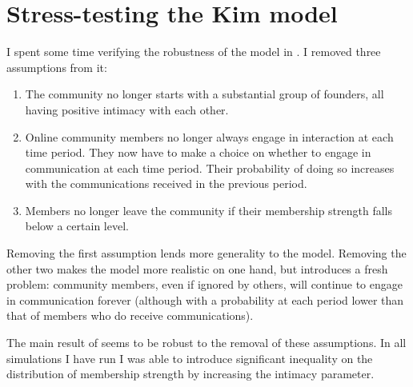 \documentclass{article}
\begin{document}
\maketitle

\tableofcontents

\section{Stress-testing the Kim model}

I spent some time verifying the robustness of the model in \cite{kim2015group}. I removed three assumptions from it:

\begin{enumerate}
	\item  The community no longer starts with a substantial group of founders, all having positive intimacy with each other.
	\item Online community members no longer always engage in interaction at each time period. They now have to make a choice on whether to engage in communication at each time period. Their probability of doing so increases with the communications received in the previous period.
	\item Members no longer leave the community if their membership strength falls below a certain level.
\end{enumerate}

Removing the first assumption lends more generality to the model. Removing the other two makes the model more realistic on one hand, but introduces a fresh problem: community members, even if ignored by others, will continue to engage in communication forever (although with a probability at each period lower than that of members who do receive communications). 

The main result of \cite{kim2015group} seems to be robust to the removal of these assumptions. In all simulations I have run I was able to introduce significant inequality on the distribution of membership strength by increasing the intimacy parameter. 
\end{document}
